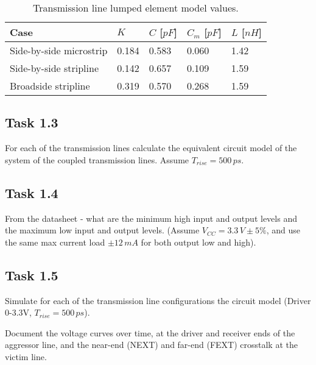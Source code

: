 \documentclass[../main.tex]{subfiles}
\begin{document}
\begin{table}[h]
    \centering
    \begin{tabular}{l|l l l l}
        \toprule[1pt]
        \textbf{Case} & $K$ & $C$ [$\si{pF}$] & $C_m$ [$\si{pF}$] & $L$ [$\si{nH}$] \\
        \midrule
        Side-by-side microstrip & 0.184 & 0.583 & 0.060 & 1.42 \\
        Side-by-side stripline  & 0.142 & 0.657 & 0.109 & 1.59 \\
        Broadside stripline     & 0.319 & 0.570 & 0.268 & 1.59 \\
        \bottomrule[1pt]
    \end{tabular}
    \caption{Transmission line lumped element model values.}
    \label{tab:tl-params}
\end{table}


\newpage

\subsection{Task 1.3}

For each of the transmission lines calculate the equivalent circuit model of the system of the coupled transmission lines. Assume $T_{rise} = 500\,\si{ps}$.

\solution

\subsection{Task 1.4}

From the datasheet - what are the minimum high input and output levels and the maximum low input and output levels. (Assume $V_{CC} = 3.3\,\si{V} \pm 5\%$, and use the same max current load $\pm 12 \,\si{mA}$ for both output low and high).

\solution

\subsection{Task 1.5}

Simulate for each of the transmission line configurations the circuit model (Driver 0-3.3V, $T_{rise} = 500\,\si{ps}$).

\vspace{10pt}
Document the voltage curves over time, at the driver and receiver ends of the aggressor line, and the near-end (NEXT) and far-end (FEXT) crosstalk at the victim line.
\end{document}
